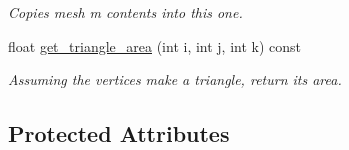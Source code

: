 \begin{DoxyCompactItemize}
\begin{DoxyCompactList}\small\item\em Copies mesh {\itshape m} contents into this one. \end{DoxyCompactList}\item 
float \hyperlink{classgeoproc_1_1TriangleMesh_a8a07f19f9d81952752d9c8973a2eb011}{get\+\_\+triangle\+\_\+area} (int i, int j, int k) const
\begin{DoxyCompactList}\small\item\em Assuming the vertices make a triangle, return its area. \end{DoxyCompactList}\end{DoxyCompactItemize}
\subsection*{Protected Attributes}
